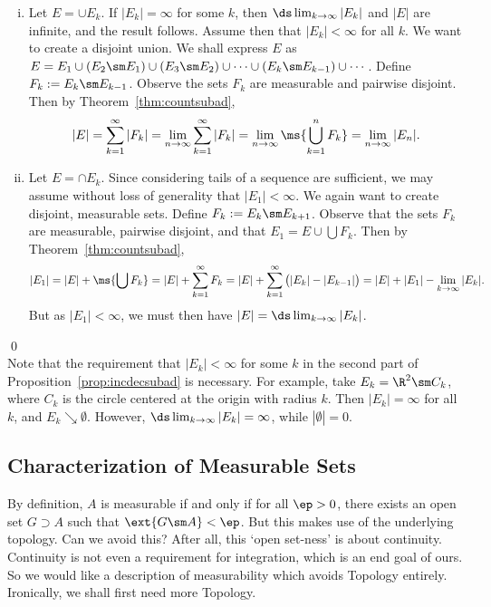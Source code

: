\pf \hfill
\begin{enumerate}[(i)]
\item Let $E= \cup E_k$. If $|E_k|=\infty$ for some $k$, then $\ds\lim_{k \to \infty} |E_k|$ and $|E|$ are infinite, and the result follows. Assume then that $|E_k|<\infty$ for all $k$. We want to create a disjoint union. We shall express $E$ as $E= E_1 \cup (E_2 \sm E_1) \cup (E_3 \sm E_2) \cup \cdots \cup (E_k \sm E_{k-1}) \cup \cdots$. Define $F_k:= E_k \sm E_{k-1}$. Observe the sets $F_k$ are measurable and pairwise disjoint. Then by Theorem~\ref{thm:countsubad},
	\[
	|E|= \sum_{k=1}^\infty |F_k|= \lim_{n \to \infty} \sum_{k=1}^\infty |F_k|= \lim_{n \to \infty} \ms{\bigcup_{k=1}^n F_k}= \lim_{n \to \infty} |E_n|.
	\]

\item Let $E= \cap E_k$. Since considering tails of a sequence are sufficient, we may assume without loss of generality that $|E_1|<\infty$. We again want to create disjoint, measurable sets. Define $F_k:= E_k \sm E_{k+1}$. Observe that the sets $F_k$ are measurable, pairwise disjoint, and that $E_1= E \cup \bigcup F_k$. Then by Theorem~\ref{thm:countsubad},
	\[
	|E_1|= |E| + \ms{\bigcup F_k}= |E|+ \sum_{k=1}^\infty F_k= |E| + \sum_{k=1}^\infty \big( |E_k| - |E_{k-1}| \big)= |E| + |E_1| - \lim_{k \to \infty} |E_k|.
	\]
But as $|E_1|<\infty$, we must then have $|E|= \ds \lim_{k \to \infty} |E_k|$. 
\end{enumerate} \qed \\


Note that the requirement that $|E_k|<\infty$ for some $k$ in the second part of Proposition~\ref{prop:incdecsubad} is necessary. For example, take $E_k= \R^2 \sm C_k$, where $C_k$ is the circle centered at the origin with radius $k$. Then $|E_k|=\infty$ for all $k$, and $E_k \searrow \emptyset$. However, $\ds \lim_{k \to \infty} |E_k|=\infty$, while $|\emptyset|=0$. 



 \subsection{Characterization of Measurable Sets}
 
 By definition, $A$ is measurable if and only if for all $\ep>0$, there exists an open set $G \supset A$ such that $\ext{G \sm A}<\ep$. But this makes use of the underlying topology. Can we avoid this? After all, this `open set-ness' is about continuity. Continuity is not even a requirement for integration, which is an end goal of ours. So we would like a description of measurability which avoids Topology entirely. Ironically, we shall first need more Topology.
 
